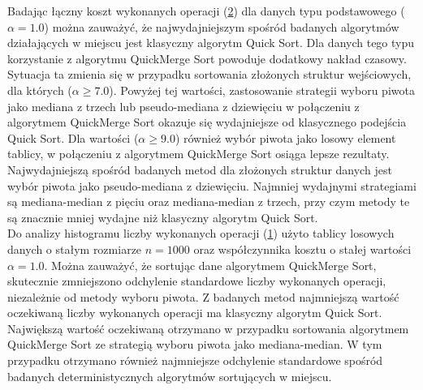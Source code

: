 Badając łączny koszt wykonanych operacji (\ref{fig:quick-merge-sort-deterministic-pivot-cost-factor}) dla danych typu podstawowego ($\alpha = 1.0$) można zauważyć, że najwydajniejszym spośród badanych algorytmów działających w miejscu jest klasyczny algorytm Quick Sort. Dla danych tego typu korzystanie z algorytmu QuickMerge Sort powoduje dodatkowy nakład czasowy. Sytuacja ta zmienia się w przypadku sortowania złożonych struktur wejściowych, dla których ($\alpha \ge 7.0$). Powyżej tej wartości, zastosowanie strategii wyboru piwota jako mediana z trzech lub pseudo-mediana z dziewięciu w połączeniu z algorytmem QuickMerge Sort okazuje się wydajniejsze od klasycznego podejścia Quick Sort. Dla wartości ($\alpha \ge 9.0$) również wybór piwota jako losowy element tablicy, w połączeniu z algorytmem QuickMerge Sort osiąga lepsze rezultaty. Najwydajniejszą spośród badanych metod dla złożonych struktur danych jest wybór piwota jako pseudo-mediana z dziewięciu. Najmniej wydajnymi strategiami są mediana-median z pięciu oraz mediana-median z trzech, przy czym metody te są znacznie mniej wydajne niż klasyczny algorytm Quick Sort.\\

Do analizy histogramu liczby wykonanych operacji (\ref{fig:quick-merge-sort-deterministic-pivot-density}) użyto tablicy losowych danych o stałym rozmiarze $n = 1000$ oraz współczynnika kosztu o stałej wartości $\alpha = 1.0$. 
Można zauważyć, że sortując dane algorytmem QuickMerge Sort, skutecznie zmniejszono odchylenie standardowe liczby wykonanych operacji, niezależnie od metody wyboru piwota. Z badanych metod najmniejszą wartość oczekiwaną liczby wykonanych operacji ma klasyczny algorytm Quick Sort. Największą wartość oczekiwaną otrzymano w przypadku sortowania algorytmem QuickMerge Sort ze strategią wyboru piwota jako mediana-median. W tym przypadku otrzymano również najmniejsze odchylenie standardowe spośród badanych deterministycznych algorytmów sortujących w miejscu.\\

\begin{figure}[]
	\centering
	
	\caption[]{}
	\label{fig:quick-merge-sort-deterministic-pivot-density}
\end{figure}

\begin{figure}[]
	\centering
	
	\caption[]{}
	\label{fig:quick-merge-sort-deterministic-pivot-cost-factor}
\end{figure}

